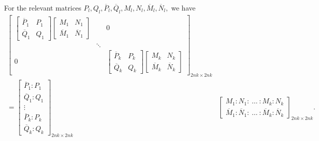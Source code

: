 \documentclass[10pt,reqno,oneside,a4paper]{article}
\begin{document}
\begin{lem}\label{P2.CA-lemma}
For the relevant matrices $P_l, Q_l, \overline{P}_l, \overline{Q}_l, M_l, N_l, \overline{M}_l, \overline{N}_l,$ we have
\begin{equation*}
\begin{aligned}
\begin{bmatrix}
\begin{bmatrix}
\overline{P}_1 & P_1 \\
\overline{Q}_1 & Q_1 
\end{bmatrix} 
\begin{bmatrix}
M_1 & N_1  \\
\overline{M}_1 & \overline{N}_1 
\end{bmatrix} & & 0 \\
 & \ddots & \\
0 & & \begin{bmatrix}
\overline{P}_k & P_k \\
\overline{Q}_k & Q_k 
\end{bmatrix} 
\begin{bmatrix}
M_k & N_k  \\
\overline{M}_k & \overline{N}_k 
\end{bmatrix}
\end{bmatrix}_{2nk\times 2nk}& \\
=
\begin{bmatrix}
\overline{P}_1 : P_1 \\
\overline{Q}_1 : Q_1 \\
\vdots \\
\overline{P}_k : P_k \\
\overline{Q}_k : Q_k 
\end{bmatrix}_{2nk \times 2nk}
&
\begin{bmatrix}
M_1 : N_1 :~ \ldots ~: M_k : N_k \\
\overline{M}_1 : \overline{N}_1 :~ \ldots ~: \overline{M}_k : \overline{N}_k 
\end{bmatrix}_{2nk \times 2nk}.
\end{aligned}
\end{equation*}
\end{lem}
\end{document}
